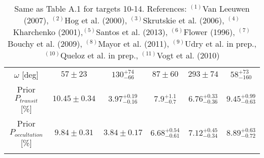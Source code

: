 \documentclass[traditabstract]{aa}
\begin{document}
\begin{appendix}
\begin{table*}
\begin{center}
{\begin{tabular}{cccccc}
 $\omega$ [deg]                     & $57 \pm 23$              & $130_{-66}^{+74}$          & $87 \pm 60$                       & $293 \pm 74$                                     &   $58_{-160}^{+73}$   \\ \noalign {\smallskip} 
Prior $P_{transit}$ [\%]           & $10.45 \pm 0.34$       &  $3.97_{-0.16}^{+0.19}$           & $7.9_{-0.7}^{+1.1}$     &   $6.76_{-0.36}^{+0.33}$                & $9.45_{-0.63}^{+0.99}$ \\ \noalign {\smallskip} 
Prior $P_{occultation}$ [\%]    & $9.84 \pm 0.31$            & $3.84 \pm 0.17$              &  $6.68_{-0.61}^{+0.54}$      & $7.12_{-0.34}^{+0.45}$                   &   $8.89_{-0.72}^{+0.63}$ \\ \noalign {\smallskip} 
\hline \noalign {\smallskip} 
\end{tabular}
}
\end{center}
\caption{Same as Table A.1 for targets 10-14. References: $^{(1)}$Van Leeuwen (2007), $^{(2)}$Hog et al. (2000), $^{(3)}$Skrutskie et al. (2006),   $^{(4)}$Kharchenko (2001),$^{(5)}$Santos et al. (2013), $^{(6)}$Flower (1996),  $^{(7)}$Bouchy et al. (2009), $^{(8)}$Mayor et al. (2011), $^{(9)}$Udry et al. in prep.,  $^{(10)}$Queloz et al. in prep.,  $^{(11)}$Vogt et al. (2010)} 
\end{table*}


\end{appendix}
\end{document}
